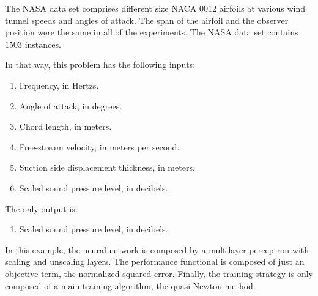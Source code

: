 The NASA data set comprises different size NACA 0012 airfoils at
various wind tunnel speeds and angles of attack. The span of the
airfoil and the observer position were the same in all of the
experiments. The NASA data set contains $1503$ instances. 

In that way, this problem has the following inputs:

\begin{enumerate}
\item Frequency, in Hertzs.
\item Angle of attack, in degrees.
\item Chord length, in meters.
\item Free-stream velocity, in meters per second.
\item Suction side displacement thickness, in meters.
\item Scaled sound pressure level, in decibels.
\end{enumerate}

The only output is:

\begin{enumerate}
\item Scaled sound pressure level, in decibels.
\end{enumerate}

In this example, the neural network is composed by a multilayer perceptron with scaling and unscaling layers. 
The performance functional is composed of just an objective term, the normalized squared error. 
Finally, the training strategy is only composed of a main training algorithm, the quasi-Newton method. 


